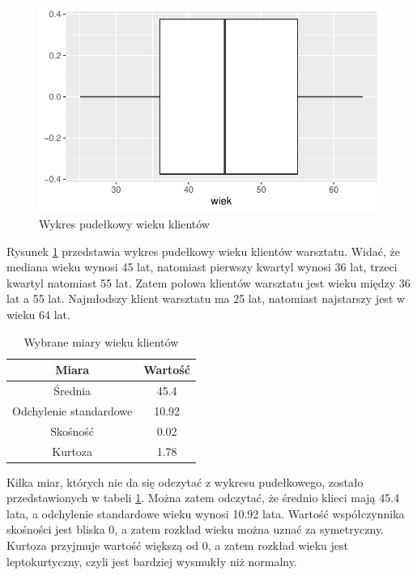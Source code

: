 \documentclass{article}\usepackage[]{graphicx}\usepackage[]{xcolor}
\makeatletter
\def\maxwidth{ %
  \ifdim\Gin@nat@width>\linewidth
    \linewidth
  \else
    \Gin@nat@width
  \fi
}
\newenvironment{knitrout}{}{} %
\makeatother
\begin{document}
\begin{knitrout}
\color{fgcolor}\begin{figure}[H]

{\centering \includegraphics[width=\maxwidth]{figure/fig_wiek-1} 

}

\caption[Wykres pudełkowy wieku klientów]{Wykres pudełkowy wieku klientów}\label{fig:fig_wiek}
\end{figure}

\end{knitrout}

Rysunek \ref{fig:fig_wiek} przedstawia wykres pudełkowy wieku klientów warsztatu. Widać, że mediana wieku wynosi 45 lat, natomiast pierwszy kwartyl wynosi 36 lat, trzeci kwartyl natomiast 55 lat. Zatem połowa klientów warsztatu jest wieku między 36 lat a 55 lat.
Najmłodszy klient warsztatu ma 25 lat, natomiast najstarszy jest w wieku 64 lat.



\begin{table}[H]
\centering
\begin{tabular}{c|c} \hline
Miara & Wartość \\ \hline
Średnia & 45.4 \\ 
Odchylenie standardowe & 10.92 \\
Skośność & 0.02  \\ 
Kurtoza & 1.78 \\ \hline
\end{tabular}
\caption{Wybrane miary wieku klientów}
\label{tab_wiek}
\end{table}

Kilka miar, których nie da się odczytać z wykresu pudełkowego, zostało przedstawionych w tabeli \ref{tab_wiek}. Można zatem odczytać, że średnio klieci mają 45.4 lata, a odchylenie standardowe wieku wynosi 10.92 lata. Wartość współczynnika skośności jest bliska 0, a zatem rozkład wieku można uznać za symetryczny. Kurtoza przyjmuje wartość większą od 0, a zatem rozkład wieku jest leptokurtyczny, czyli jest bardziej wysmukły niż normalny.
\end{document}
